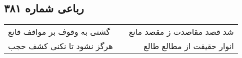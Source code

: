 \begin{center}
\section*{رباعی شماره ۳۸۱}
\label{sec:sh381}
\begin{longtable}{l p{0.5cm} r}
گشتی به وقوف بر مواقف قانع
&&
شد قصد مقاصدت ز مقصد مانع
\\
هرگز نشود تا نکنی کشف حجب
&&
انوار حقیقت از مطالع طالع
\\
\end{longtable}
\end{center}
